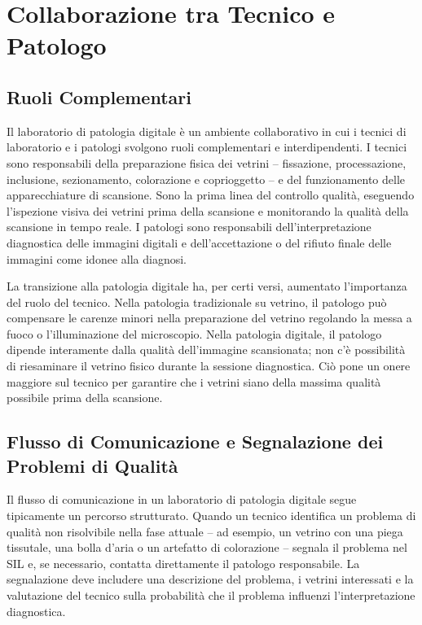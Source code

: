 \section{Collaborazione tra Tecnico e Patologo}
\label{sec:ch2-collaboration}

\subsection{Ruoli Complementari}

Il laboratorio di patologia digitale è un ambiente collaborativo in cui i tecnici di laboratorio
e i patologi svolgono ruoli complementari e interdipendenti. I tecnici sono responsabili della
preparazione fisica dei vetrini -- fissazione, processazione, inclusione, sezionamento,
colorazione e coprioggetto -- e del funzionamento delle apparecchiature di scansione. Sono la
prima linea del controllo qualità, eseguendo l'ispezione visiva dei vetrini prima della
scansione e monitorando la qualità della scansione in tempo reale. I patologi sono responsabili
dell'interpretazione diagnostica delle immagini digitali e dell'accettazione o del rifiuto finale
delle immagini come idonee alla diagnosi.

La transizione alla patologia digitale ha, per certi versi, aumentato l'importanza del ruolo del
tecnico. Nella patologia tradizionale su vetrino, il patologo può compensare le carenze minori
nella preparazione del vetrino regolando la messa a fuoco o l'illuminazione del microscopio.
Nella patologia digitale, il patologo dipende interamente dalla qualità dell'immagine scansionata;
non c'è possibilità di riesaminare il vetrino fisico durante la sessione diagnostica. Ciò pone
un onere maggiore sul tecnico per garantire che i vetrini siano della massima qualità possibile
prima della scansione.

\subsection{Flusso di Comunicazione e Segnalazione dei Problemi di Qualità}

Il flusso di comunicazione in un laboratorio di patologia digitale segue tipicamente un percorso
strutturato. Quando un tecnico identifica un problema di qualità non risolvibile nella fase attuale 
-- ad esempio, un vetrino con una piega tissutale, una bolla d'aria o un artefatto di colorazione -- 
segnala il problema nel SIL e, se necessario, contatta direttamente il patologo responsabile. La 
segnalazione deve includere una descrizione del problema, i vetrini interessati e la valutazione del 
tecnico sulla probabilità che il problema influenzi l'interpretazione diagnostica.


